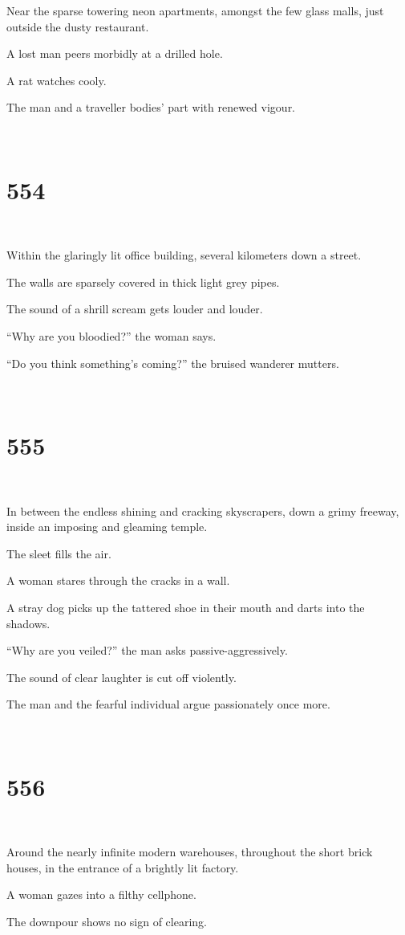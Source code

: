 \documentclass{report}
\begin{document}
Near the sparse towering neon apartments, amongst the few glass malls, just outside the dusty restaurant.

A lost man peers morbidly at a drilled hole.

A rat watches cooly.

The man and a traveller bodies' part with renewed vigour.

~
\chapter*{554}
~

Within the glaringly lit office building, several kilometers down a street.

The walls are sparsely covered in thick light grey pipes.

The sound of a shrill scream gets louder and louder.

``Why are you bloodied?'' the woman says.

``Do you think something's coming?'' the bruised wanderer mutters.

~
\chapter*{555}
~

In between the endless shining and cracking skyscrapers, down a grimy freeway, inside an imposing and gleaming temple.

The sleet fills the air.

A woman stares through the cracks in a wall.

A stray dog picks up the tattered shoe in their mouth and darts into the shadows.

``Why are you veiled?'' the man asks passive-aggressively.

The sound of clear laughter is cut off violently.

The man and the fearful individual argue passionately once more.

~
\chapter*{556}
~

Around the nearly infinite modern warehouses, throughout the short brick houses, in the entrance of a brightly lit factory.

A woman gazes into a filthy cellphone.

The downpour shows no sign of clearing.
\end{document}

